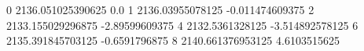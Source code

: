 0 2136.051025390625 0.0
1 2136.03955078125 -0.011474609375
2 2133.155029296875 -2.89599609375
4 2132.5361328125 -3.514892578125
6 2135.391845703125 -0.6591796875
8 2140.661376953125 4.6103515625
